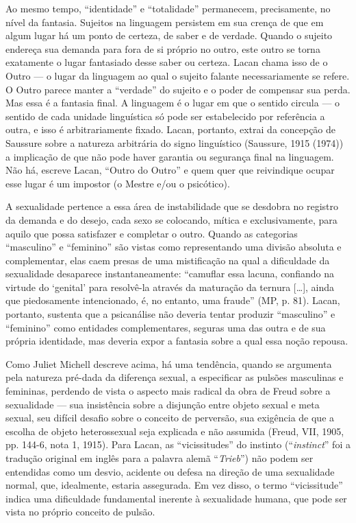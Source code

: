 Ao mesmo tempo, ``identidade'' e ``totalidade'' permanecem,
precisamente, no nível da fantasia. Sujeitos na linguagem persistem em
sua crença de que em algum lugar há um ponto de certeza, de saber e de
verdade. Quando o sujeito endereça sua demanda para fora de si próprio
no outro, este outro se torna exatamente o lugar fantasiado desse saber
ou certeza. Lacan chama isso de o Outro --- o lugar da linguagem ao qual
o sujeito falante necessariamente se refere. O Outro parece manter a
``verdade'' do sujeito e o poder de compensar sua perda. Mas essa é a
fantasia final. A linguagem é o lugar em que o sentido circula --- o
sentido de cada unidade linguística só pode ser estabelecido por
referência a outra, e isso é arbitrariamente fixado. Lacan, portanto,
extrai da concepção de Saussure sobre a natureza arbitrária do signo
linguístico (Saussure, 1915 (1974)) a implicação de que não pode haver
garantia ou segurança final na linguagem. Não há, escreve Lacan, ``Outro
do Outro'' e quem quer que reivindique ocupar esse lugar é um impostor
(o Mestre e/ou o psicótico).

A sexualidade pertence a essa área de instabilidade que se desdobra no
registro da demanda e do desejo, cada sexo se colocando, mítica e
exclusivamente, para aquilo que possa satisfazer e completar o outro.
Quando as categorias ``masculino'' e ``feminino'' são vistas como
representando uma divisão absoluta e complementar, elas caem presas de
uma mistificação na qual a dificuldade da sexualidade desaparece
instantaneamente: ``camuflar essa lacuna, confiando na virtude do
`genital' para resolvê-la através da maturação da ternura {[}\ldots{}{]},
ainda que piedosamente intencionado, é, no entanto, uma fraude'' (MP, p.
81). Lacan, portanto, sustenta que a psicanálise não deveria tentar
produzir ``masculino'' e ``feminino'' como entidades complementares,
seguras uma das outra e de sua própria identidade, mas deveria expor a
fantasia sobre a qual essa noção repousa.

Como Juliet Michell descreve acima, há uma tendência, quando se
argumenta pela natureza pré-dada da diferença sexual, a especificar as
pulsões masculinas e femininas, perdendo de vista o aspecto mais radical
da obra de Freud sobre a sexualidade --- sua insistência sobre a
disjunção entre objeto sexual e meta sexual, seu difícil desafio sobre o
conceito de perversão, sua exigência de que a escolha de objeto
heterossexual seja explicada e não assumida (Freud, VII, 1905, pp.
144-6, nota 1, 1915). Para Lacan, as ``vicissitudes'' do instinto
(``\emph{instinct}'' foi a tradução original em inglês para a palavra
alemã ``\emph{Trieb}'') não podem ser entendidas como um desvio,
acidente ou defesa na direção de uma sexualidade normal, que,
idealmente, estaria assegurada. Em vez disso, o termo ``vicissitude''
indica uma dificuldade fundamental inerente à sexualidade humana, que
pode ser vista no próprio conceito de pulsão.

